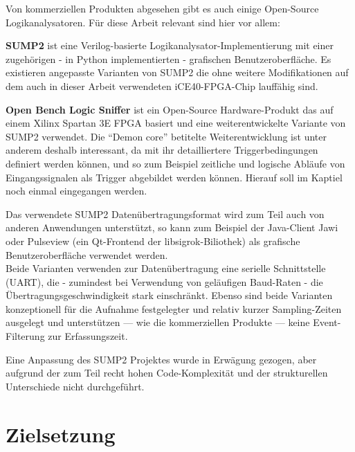 Von kommerziellen Produkten abgesehen gibt es auch einige Open-Source Logikanalysatoren. Für diese Arbeit relevant sind hier vor allem:
\begin{description}
	\item \textbf{SUMP2} ist eine \gls{Verilog}-basierte Logikanalysator-Implementierung mit einer zugehörigen - in Python implementierten - grafischen Benutzeroberfläche. Es existieren angepasste Varianten von SUMP2 die ohne weitere Modifikationen auf dem auch in dieser Arbeit verwendeten iCE40-FPGA-Chip lauffähig sind\cite{web:blackmesa_sump2}.  
	\item \textbf{Open Bench Logic Sniffer} ist ein Open-Source Hardware-Produkt das auf einem Xilinx Spartan 3E FPGA basiert und eine weiterentwickelte Variante von SUMP2 verwendet. Die ``Demon core'' betitelte Weiterentwicklung ist unter anderem deshalb interessant, da mit ihr detailliertere Triggerbedingungen definiert werden können, und so zum Beispiel zeitliche und logische Abläufe von Eingangssignalen als Trigger abgebildet werden können. Hierauf soll im Kaptiel  noch einmal eingegangen werden.
\end{description}

Das verwendete SUMP2 Datenübertragungsformat wird zum Teil auch von anderen Anwendungen unterstützt, so kann zum Beispiel der Java-Client Jawi\cite{web:ols} oder Pulseview\cite{web:sigrok_ols} (ein Qt-Frontend der libsigrok-Biliothek) als grafische Benutzeroberfläche verwendet werden.\\ 
Beide Varianten verwenden zur Datenübertragung eine serielle Schnittstelle (\acrshort{UART}), die - zumindest bei Verwendung von geläufigen Baud-Raten - die Übertragungsgeschwindigkeit stark einschränkt. Ebenso sind beide Varianten konzeptionell für die Aufnahme festgelegter und relativ kurzer Sampling-Zeiten ausgelegt und unterstützen --- wie die kommerziellen Produkte --- keine Event-Filterung zur Erfassungszeit.  

Eine Anpassung des SUMP2 Projektes wurde in Erwägung gezogen, aber aufgrund der zum Teil recht hohen Code-Komplexität und der strukturellen Unterschiede nicht durchgeführt.

\section{Zielsetzung}
\label{ch:Einfuehrung:Zielsetzung}

